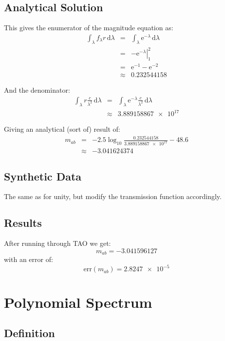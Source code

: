 \documentclass[12pt]{scrartcl}
\newcommand{\dx}[1]{\ensuremath{\,\mathrm{d}#1}}
\begin{document}
\subsection{Analytical Solution}

This gives the enumerator of the magnitude equation as:
\begin{eqnarray*}
\int_\lambda f_\lambda r \dx{\lambda} & = & 
  \int_\lambda \mathrm{e}^{-\lambda} \dx{\lambda} \\
& = & \left. -\mathrm{e}^{-\lambda} \right|_1^2 \\
& = & \mathrm{e}^{-1} - \mathrm{e}^{-2} \\
& \approx & 0.232544158
\end{eqnarray*}

And the denominator:
\begin{eqnarray*}
\int_\lambda r \frac{c}{\lambda^2} \dx{\lambda}
& = & \int_\lambda \mathrm{e}^{-\lambda} \frac{c}{\lambda^2}
\dx{\lambda} \\
& \approx & \num{3.889158867e+17}
\end{eqnarray*}

Giving an analytical (sort of) result of:
\begin{eqnarray*}
m_{ab} & = & -2.5\log_{10} \frac{0.232544158}{\num{3.889158867e+17}} - 48.6 \\
& \approx & -3.041624374
\end{eqnarray*}

\subsection{Synthetic Data}

The same as for unity, but modify the transmission function accordingly.

\subsection{Results}

After running through TAO we get:
\[ m_{ab} = -3.041596127 \]
with an error of:
\[ \mathrm{err}(m_{ab}) = \num{2.8247e-5} \]


\section{Polynomial Spectrum}

\subsection{Definition}
\end{document}
